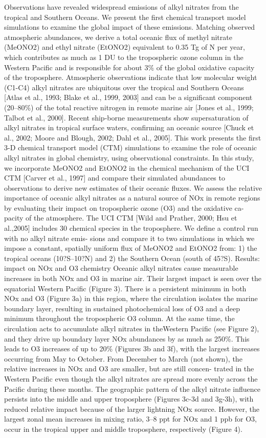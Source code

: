 \documentclass[11pt,a4paper]{article}
\begin{document}
Observations have revealed widespread emissions of alkyl nitrates from the tropical and Southern Oceans. We present the first chemical transport model simulations to examine the global impact of these emissions. Matching observed atmospheric abundances, we derive a total oceanic flux of methyl nitrate (MeONO2) and ethyl nitrate (EtONO2) equivalent to 0.35 Tg of N per year, which contributes as much as 1 DU to the tropospheric ozone column in the Western Pacific and is responsible for about 3\% of the global oxidative capacity of the troposphere.
Atmospheric observations indicate that low molecular weight (C1-C4) alkyl nitrates are ubiquitous over the tropical and Southern Oceans [Atlas et al., 1993; Blake et al., 1999, 2003] and can be a significant component (20–80\%) of the total reactive nitrogen in remote marine air [Jones et al., 1999; Talbot et al., 2000]. Recent ship-borne measurements show supersaturation of alkyl nitrates in tropical surface waters, confirming an oceanic source [Chuck et al., 2002; Moore and Blough, 2002; Dahl et al., 2005]. This work presents the first 3-D chemical transport model (CTM) simulations to examine the role of oceanic alkyl nitrates in global chemistry, using observational constraints.
In this study, we incorporate MeONO2 and EtONO2 in the chemical mechanism of the UCI CTM [Carver et al., 1997] and compare their simulated abundances to observations to derive new estimates of their oceanic fluxes. We assess the relative importance of oceanic alkyl nitrates as a natural source of NOx in remote regions by evaluating their impact on tropospheric ozone (O3) and the oxidative ca- pacity of the atmosphere.
The UCI CTM [Wild and Prather, 2000; Hsu et al.,2005] includes 30 chemical species in the troposphere.
We define a control run with no alkyl nitrate emis-
sions and compare it to two simulations in which we impose a constant, spatially uniform flux of MeONO2 and EtONO2 from: 1) the tropical oceans (10?S–10?N) and 2) the Southern Ocean (south of 45?S).
Results: impact on NOx and O3 chemistry
Oceanic alkyl nitrates cause measurable increases in
both NOx and O3 in marine air. Their largest impact is seen over the equatorial Western Pacific (Figure 3). There is a persistent minimum in both NOx and O3 (Figure 3a) in this region, where the circulation isolates the marine boundary layer, resulting in sustained photochemical loss of O3 and a deep minimum throughout the tropospheric O3 column. At the same time, the circulation acts to accumulate alkyl nitrates in theWestern Pacific (see Figure 2), and they drive up boundary layer NOx abundances by as much as 250\%. This leads to O3 increases of up to 20\% (Figures 3b and 3f), with the largest increases occurring from May to October. From December to March (not shown), the relative increases in NOx and O3 are smaller, but are still concen- trated in the Western Pacific even though the alkyl nitrates are spread more evenly across the Pacific during these months. The geographic pattern of the alkyl nitrate influence persists into the middle and upper troposphere (Figures 3c-3d and 3g-3h), with reduced relative impact because of the larger lightning NOx source. However, the largest zonal mean increases in mixing ratio, 3–8 ppt for NOx and 1 ppb for O3, occur in the tropical upper and middle troposphere, respectively (Figure 4).
\end{document}
